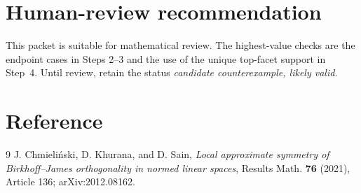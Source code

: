 \documentclass[11pt]{article}
\begin{document}
\section{Human-review recommendation}

This packet is suitable for mathematical review.  The highest-value checks
are the endpoint cases in Steps 2--3 and the use of the unique top-facet
support in Step~4.  Until review, retain the status
\emph{candidate counterexample, likely valid}.

\section{Reference}

\begin{thebibliography}{9}
J. Chmieli\'nski, D. Khurana, and D. Sain,
\emph{Local approximate symmetry of Birkhoff--James orthogonality in normed
linear spaces}, Results Math. \textbf{76} (2021), Article 136;
arXiv:2012.08162.
\end{thebibliography}
\end{document}
